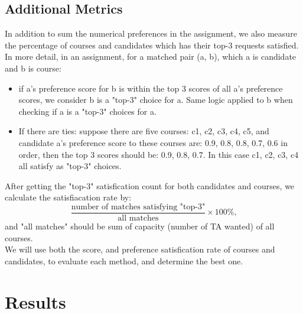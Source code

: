 \documentclass[twoside,twocolumn]{article}
\begin{document}
    \subsection{Additional Metrics}
    In addition to sum the numerical preferences in the assignment, we also measure the percentage of courses and candidates which has their top-3
    requests satisfied. In more detail, in an assignment, for a matched pair (a, b), which a is candidate and b is course:
    \begin{itemize}
        \item if a's preference score for b is within the top 3 scores of all a's preference scores, we consider b is a "top-3" choice for a. Same logic
        applied to b when checking if a is a "top-3" choices for a.
        \item If there are ties: suppose there are five courses: c1, c2, c3, c4, c5, and candidate a's preference score to these courses are: 0.9, 0.8, 0.8, 0.7,
        0.6 in order, then the top 3 scores should be: 0.9, 0.8, 0.7. In this case c1, c2, c3, c4 all satisfy as "top-3" choices.
    \end{itemize}
    After getting the "top-3" satisfication count for both candidates and courses, we calculate the satisfiacation rate by:
    $$\frac{\text{number of matches satisfying "top-3"}}{\text{all matches}} \times 100\%\text{,}$$
    and "all matches" should be sum of capacity (number of TA wanted) of all courses.
    \\ We will use both the score, and preference satisfication rate of courses and candidates, to evaluate each method, and determine the best one.

    \section{Results}
\end{document}
